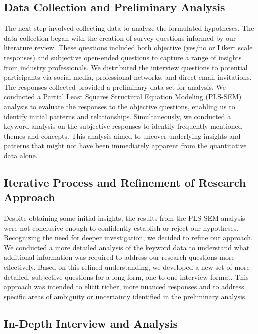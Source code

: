 \subsection{Data Collection and Preliminary Analysis}

The next step involved collecting data to analyze the formulated hypotheses. The data collection began with the creation of survey questions informed by our literature review. These questions included both objective (yes/no or Likert scale responses) and subjective open-ended questions to capture a range of insights from industry professionals. We distributed the interview questions to potential participants via social media, professional networks, and direct email invitations. The responses collected provided a preliminary data set for analysis. We conducted a Partial Least Squares Structural Equation Modeling (PLS-SEM) analysis to evaluate the responses to the objective questions, enabling us to identify initial patterns and relationships. Simultaneously, we conducted a keyword analysis on the subjective responses to identify frequently mentioned themes and concepts. This analysis aimed to uncover underlying insights and patterns that might not have been immediately apparent from the quantitative data alone.

\subsection{Iterative Process and Refinement of Research Approach}

Despite obtaining some initial insights, the results from the PLS-SEM analysis were not conclusive enough to confidently establish or reject our hypotheses. Recognizing the need for deeper investigation, we decided to refine our approach. We conducted a more detailed analysis of the keyword data to understand what additional information was required to address our research questions more effectively. Based on this refined understanding, we developed a new set of more detailed, subjective questions for a long-form, one-to-one interview format. This approach was intended to elicit richer, more nuanced responses and to address specific areas of ambiguity or uncertainty identified in the preliminary analysis.

\subsection{In-Depth Interview and Analysis}

